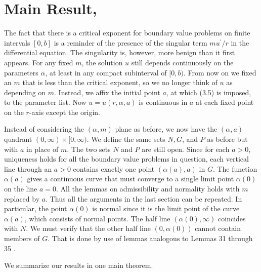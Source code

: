 \section{Main Result, }\label{sec:5}

The fact that there is a critical exponent for boundary value problems on finite 
intervals $[0, b]$ is a reminder of the presence of the singular term 
$m u^{\prime}/r$ in the differential equation. The singularity is, however,
more benign than it first appears. For any fixed $m$, the solution $u$ still 
depends continuously on the parameters $\alpha$, at least in any compact subinterval 
of $[0, b)$. From now on we fixed an $m$ that is less than the critical exponent,
so we no longer think of $u$ as depending on $m$.
Instead, we affix the initial point $a$, at which (3.5) is imposed,
to the parameter list. Now $u=u(r, \alpha, a)$ is continuous in $a$
at each fixed point on the $r$-axis except the origin.

Instead of considering the $(\alpha, m)$ plane as before,
we now have the $(\alpha, a)$ quadrant $(0, \infty) \times[0, \infty)$.
We define the same sets $N, G$, and $P$ as before but with $a$ in place of $m$.
The two sets $N$ and $P$ are still open. Since for each $a>0$,
uniqueness holds for all the boundary value problems in question,
each vertical line through an $a>0$ contains exactly one point $(\alpha(a), a)$ in $G$. 
The function $\alpha(a)$ gives a continuous curve that must converge to a single limit 
point $\alpha(0)$ on the line $a=0$. All the lemmas on admissibility and normality 
holds with $m$ replaced by $a$. Thus all the arguments in the last section can be 
repeated. In particular, the point $\alpha(0)$ is normal since it is the limit point of 
the curve $\alpha(a)$, which consists of normal points.
The half line $(\alpha(0), \infty)$ coincides with $N$. 
We must verify that the other half line $(0, \alpha(0))$ cannot contain members of $G$. 
That is done by use of lemmas analogous to Lemmas 31 through 35 .

We summarize our results in one main theorem.

